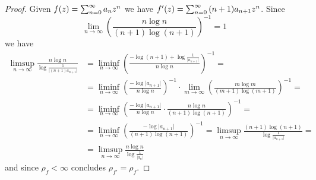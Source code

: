 \begin{proof}
    Given $f(z) = \sum_{n=0}^\infty {a_n}z^{n}$ we have $f'(z) = \sum_{n=0}^\infty {(n+1)a_{n+1}}z^{n}$. Since
    $$ \lim_{n \to \infty} \left( \frac{n \log n}{(n+1) \log(n+1)} \right)^{-1} = 1 $$
    we have
    \begin{align*}
        \limsup_{n \to \infty} \frac{n \log n}{\log \frac{1}{\vert (n+1) a_{n+1} \vert}} &= \liminf_{n \to \infty} \left( \frac{- \log (n+1) + \log \frac{1}{\vert a_{n+1} \vert}}{n \log n} \right)^{-1} = \\
        &= \liminf_{n \to \infty} \left( \frac{- \log \vert a_{n+1} \vert}{n \log n} \right)^{-1} \cdot \lim_{m \to \infty} \left( \frac{m \log m}{(m+1) \log(m+1)} \right)^{-1} = \\
        &= \liminf_{n \to \infty} \left( \frac{- \log \vert a_{n+1} \vert}{n \log n} \cdot \frac{n \log n}{(n+1) \log(n+1)} \right)^{-1} = \\
        &= \liminf_{n \to \infty} \left( \frac{- \log \vert a_{n+1} \vert}{(n+1) \log(n+1)} \right)^{-1} = \limsup_{n \to \infty} \frac{(n+1) \log (n+1)}{\log \frac{1}{\vert a_{n+1} \vert}} = \\
        &= \limsup_{n \to \infty} \frac{n \log n}{\log \frac{1}{\vert a_{n} \vert}}
    \end{align*}
    and since $\rho_f < \infty$  concludes $\rho_{f'} = \rho_f$.
\end{proof}